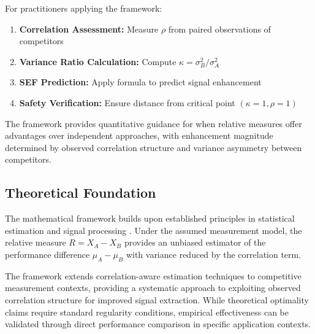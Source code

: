 For practitioners applying the framework:

\begin{enumerate}
    \item \textbf{Correlation Assessment:} Measure $\rho$ from paired observations of competitors
    \item \textbf{Variance Ratio Calculation:} Compute $\kappa = \sigma_B^2/\sigma_A^2$
    \item \textbf{SEF Prediction:} Apply formula to predict signal enhancement
    \item \textbf{Safety Verification:} Ensure distance from critical point $(\kappa=1, \rho=1)$
\end{enumerate}

The framework provides quantitative guidance for when relative measures offer advantages over independent approaches, with enhancement magnitude determined by observed correlation structure and variance asymmetry between competitors.

\subsection{Theoretical Foundation}

The mathematical framework builds upon established principles in statistical estimation and signal processing \cite{shannon1948mathematical}. Under the assumed measurement model, the relative measure $R = X_A - X_B$ provides an unbiased estimator of the performance difference $\mu_A - \mu_B$ with variance reduced by the correlation term.

The framework extends correlation-aware estimation techniques to competitive measurement contexts, providing a systematic approach to exploiting observed correlation structure for improved signal extraction. While theoretical optimality claims require standard regularity conditions, empirical effectiveness can be validated through direct performance comparison in specific application contexts.
